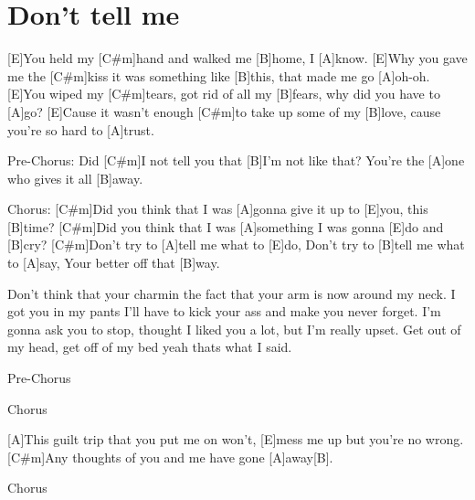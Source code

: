 \section{Don't tell me}
\begin{multicols}{2}
\begin{guitar}
[E  C#m  B  A  x2]{}

[E]You held my [C#m]hand and walked me 
[B]home, I [A]know.
[E]Why you gave me the [C#m]kiss it was something like 
[B]this, that made me go [A]oh-oh.
[E]You wiped my [C#m]tears, got rid of all my 
[B]fears, why did you have to [A]go?
[E]Cause it wasn't enough [C#m]to take up some of my 
[B]love, cause you're so hard to [A]trust.


Pre-Chorus:
Did [C#m]I not tell you that [B]I'm not like that?
You're the [A]one who gives it all [B]away.

Chorus:
[C#m]Did you think that I was [A]gonna 
give it up to [E]you, this [B]time?
[C#m]Did you think that I was [A]something 
I was gonna [E]do and [B]cry?
[C#m]Don't try to [A]tell me what to [E]do,
Don't try to [B]tell me what to [A]say,
Your better off that [B]way.


Don't think that your charmin the 
fact that your arm is now around my neck.
I got you in my pants I'll have to kick 
your ass and make you never forget.
I'm gonna ask you to stop, thought 
I liked you a lot, but I'm really upset.
Get out of my head, get off of my bed 
yeah thats what I said.


Pre-Chorus

Chorus


[A]This guilt trip that you put me on won't, 
[E]mess me up but you're no wrong.
[C#m]Any thoughts of you and me have gone [A]away[B].


Chorus
\end{guitar}
\end{multicols}
